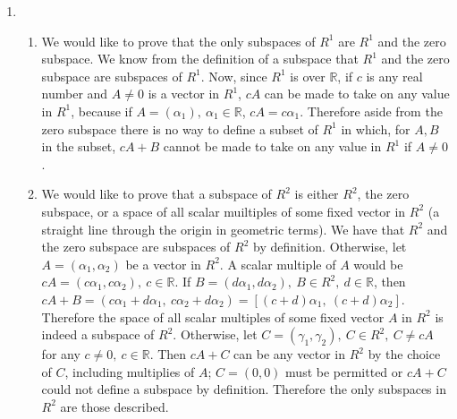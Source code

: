 \documentclass[12pt]{article}
\begin{document}
\begin{enumerate}
        \item
          \begin{enumerate}
            \item
              We would like to prove that the only subspaces of $R^1$ are $R^1$ and
              the zero subspace. We know from the definition of a subspace that $R^1$
              and the zero subspace are subspaces of $R^1$. Now, since $R^1$ is over
              $\mathbb{R}$, if $c$ is any real number and $A \neq 0$ is a vector in
              $R^1$, $cA$ can be made to take on any value in $R^1$, because if $A =
              (\alpha_1),\ \alpha_1 \in \mathbb{R}$, $cA = c\alpha_1$. Therefore
              aside from the zero subspace there is no way to define a subset of
              $R^1$ in which, for $A,B$ in the subset, $cA + B$ cannot be made to
              take on any value in $R^1$ if $A \neq 0$.
            \item
              We would like to prove that a subspace of $R^2$ is either $R^2$, the
              zero subspace, or a space of all scalar muiltiples of some fixed vector
              in $R^2$ (a straight line through the origin in geometric terms). We
              have that $R^2$ and the zero subspace are subspaces of $R^2$ by
              definition. Otherwise, let $A = (\alpha_1,\alpha_2)$ be a vector in
              $R^2$. A scalar multiple of $A$ would be $cA = (c\alpha_1,c\alpha_2),\
              c \in \mathbb{R}$.  If $B = (d\alpha_1,d\alpha_2),\ B \in R^2,\ d \in
              \mathbb{R}$, then $cA + B = (c\alpha_1+d\alpha_1,\ c\alpha_2+d\alpha_2)
              = [(c+d)\alpha_1,\ (c+d)\alpha_2]$. Therefore the space of all scalar
              multiples of some fixed vector $A$ in $R^2$ is indeed a subspace of
              $R^2$. Otherwise, let $C = (\gamma_1,\gamma_2),\ C \in R^2,\ C \neq cA$
              for any $c \neq 0,\ c \in \mathbb{R}$. Then $cA + C$ can be any vector
              in $R^2$ by the choice of $C$, including multiplies of $A$; $C = (0,0)$
              must be permitted or $cA + C$ could not define a subspace by
              definition. Therefore the only subspaces in $R^2$ are those described.
          \end{enumerate}

  \end{enumerate}
\end{document}
